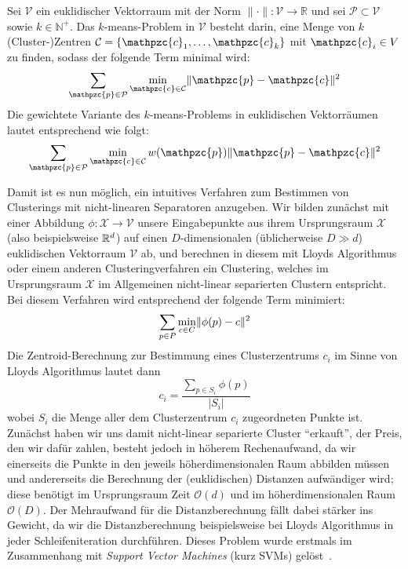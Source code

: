 \begin{definition}
\label{def:kmeans-kmedian-innerproduct}
Sei $\mathcal{V}$ ein euklidischer Vektorraum mit der Norm $\lVert \cdot \rVert : \mathcal{V} \rightarrow \mathbb{R}$
und sei $\mathcal{P} \subset \mathcal{V}$ sowie $k \in \mathbb{N}^{+}$.
Das $k$-means-Problem in $\mathcal{V}$ besteht darin, eine Menge von $k$ (Cluster-)Zentren
$\mathcal{C} = \{ \mathpzc{c}_1, \dots, \mathpzc{c}_k \}$ mit $\mathpzc{c}_i \in V$ zu finden, sodass der folgende Term
minimal wird:
\[ \sum_{\mathpzc{p} \in \mathcal{P}} \min_{\mathpzc{c} \in \mathcal{C}} \EuclidSquared{\mathpzc{p}}{\mathpzc{c}} \]
Die gewichtete Variante des $k$-means-Problems in euklidischen Vektorräumen lautet entsprechend wie folgt:
\[ \sum_{\mathpzc{p} \in \mathcal{P}} \min_{\mathpzc{c} \in \mathcal{C}} w(\mathpzc{p})
	\EuclidSquared{\mathpzc{p}}{\mathpzc{c}} \]
\end{definition}
Damit ist es nun möglich, ein intuitives Verfahren zum Bestimmen von Clusterings mit nicht-linearen Separatoren anzugeben.
Wir bilden zunächst mit einer Abbildung $\phi : \mathcal{X} \rightarrow \mathcal{V}$ unsere Eingabepunkte aus ihrem Ursprungsraum
$\mathcal{X}$ (also beispielsweise $\mathbb{R}^{d}$) auf einen $D$-dimensionalen (üblicherweise $D \gg d$) euklidischen
Vektorraum $\mathcal{V}$ ab, und berechnen in diesem mit Lloyds Algorithmus oder einem anderen Clusteringverfahren ein
Clustering, welches im Ursprungsraum $\mathcal{X}$ im Allgemeinen nicht-linear separierten Clustern entspricht.
Bei diesem Verfahren wird entsprechend der folgende Term minimiert:
\[ \sum_{p \in P} \min_{c \in C} \lVert {\phi(p)} - {c} \rVert^2 \]
Die Zentroid-Berechnung zur Bestimmung eines Clusterzentrums $c_i$ im Sinne von Lloyds Algorithmus lautet dann
\[ c_i = \frac{\sum_{p \in S_i} \phi(p)}{\left|S_i\right|} \]
wobei $S_i$ die Menge aller dem Clusterzentrum $c_i$ zugeordneten Punkte ist. Zunächst haben wir uns damit nicht-linear separierte
Cluster "`erkauft"', der Preis, den wir dafür zahlen, besteht jedoch in höherem Rechenaufwand, da wir einerseits die Punkte
in den jeweils höherdimensionalen Raum abbilden müssen und andererseits die Berechnung der (euklidischen) Distanzen aufwändiger
wird; diese benötigt im Ursprungsraum Zeit $\mathcal{O}(d)$ und im höherdimensionalen Raum $\mathcal{O}(D)$. Der Mehraufwand
für die Distanzberechnung fällt dabei stärker ins Gewicht, da wir die Distanzberechnung beispielsweise bei Lloyds Algorithmus
in jeder Schleifeniteration durchführen.
\absatz
Dieses Problem wurde erstmals im Zusammenhang mit \emph{Support Vector Machines} (kurz SVMs) gelöst~\cite{BoserGV92}.
